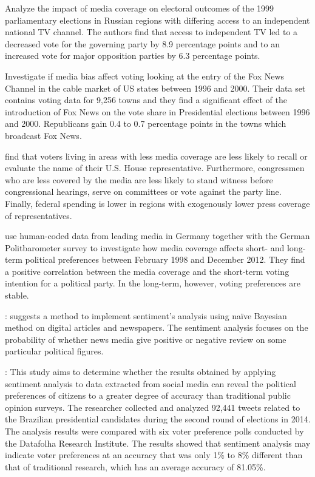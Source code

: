 \documentclass[12pt,a4paper,notitlepage]{article}
\begin{document}
\citet{enikolopov_media_2011} Analyze the impact of media coverage on electoral outcomes of the 1999 parliamentary elections in Russian regions with differing access to an independent national TV channel. The authors find that access to independent TV led to a decreased vote for the governing party by 8.9 percentage points and to an increased vote for major opposition parties by 6.3 percentage points.

\citet{dellavigna_fox_2006} Investigate if media bias affect voting looking at the entry of the Fox News Channel in the cable market of US states between 1996 and 2000. Their data set contains voting data for 9,256 towns and they find a significant effect of the introduction of Fox News on the vote share in Presidential elections between 1996 and 2000. Republicans gain 0.4 to 0.7 percentage points in the towns which broadcast Fox News.

\citet{snyder_press_2010} find that voters living in areas with less media coverage are less likely to recall or evaluate the name of their U.S. House representative. Furthermore, congressmen who are less covered by the media are less likely to stand witness before congressional hearings, serve on committees or vote against the party line. Finally, federal spending is lower in regions with exogenously lower press coverage of representatives.

\citet{dewenter_can_2018} use human-coded data from leading media in Germany together with the German Politbarometer survey to investigate how media coverage affects short- and long-term political preferences between February 1998 and December 2012. They find a positive correlation between the media coverage and the short-term voting intention for a political party. In the long-term, however, voting preferences are stable.


\citet{soelistio_simple_2015}: suggests a method to implement sentiment’s analysis using naïve Bayesian method on digital articles and newspapers. The sentiment analysis focuses on the probability of whether news media give positive or negative review on some particular political figures.

\citet{oliveira_can_2017}: This study aims to determine whether the results obtained by applying sentiment analysis to data extracted from social media can reveal the political preferences of citizens to a greater degree of accuracy than traditional public opinion surveys. The researcher collected and analyzed 92,441 tweets related to the Brazilian presidential candidates during the second round of elections in 2014. The analysis results were compared with six voter preference polls conducted by the Datafolha Research Institute. The results showed that sentiment analysis may indicate voter preferences at an accuracy that was only 1\% to 8\% different than that of traditional research, which has an average accuracy of 81.05\%.
\end{document}
